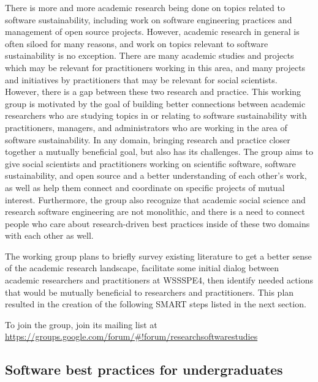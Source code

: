 \documentclass[11pt, oneside]{amsart}
\newcommand{\note}[1]{ {\textcolor{blueish}    { ***Note:      #1 }}}
\begin{document}




There is more and more academic research being done on topics related to software sustainability, including work on software engineering practices and management of open source projects. However, academic research in general is often siloed for many reasons, and work on topics relevant to software sustainability is no exception. There are many academic studies and projects which may be relevant for practitioners working in this area, and many projects and initiatives by practitioners that may be relevant for social scientists. However, there is a gap between these two research and practice.
%
This working group is motivated by the goal of building better connections between academic researchers who are studying topics in or relating to software sustainability with practitioners, managers, and administrators who are working in the area of software sustainability.
%
 In any domain, bringing research and practice closer together a mutually beneficial goal, but also has its challenges.
The group aims to give social scientists and practitioners working on scientific software, software sustainability, and open source and a better understanding of each other's work, as well as help them connect and coordinate on specific projects of mutual interest.
%
Furthermore, the group also recognize that academic social science and research software engineering are not monolithic, and there is a need to connect people who care about research-driven best practices inside of these two domains with each other as well.

The working group plans to briefly survey existing literature to get a better sense of the academic research landscape, facilitate some initial dialog between academic researchers and practitioners at WSSSPE4, then identify needed actions that would be mutually beneficial to researchers and practitioners. This plan resulted in the creation of the following SMART steps listed in the next section.


To join the group, join its mailing list at \url{https://groups.google.com/forum/#!forum/researchsoftwarestudies}


\subsection{Software best practices for undergraduates}
\label{sec:best-practices-undergrads}
\end{document}
